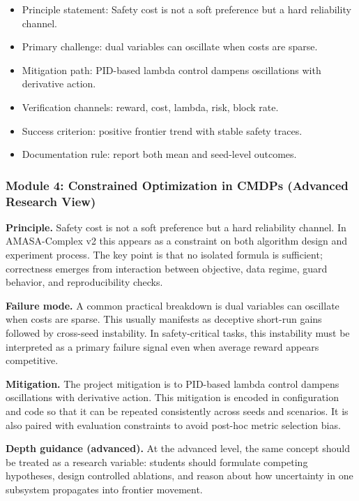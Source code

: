 \documentclass[conference]{IEEEtran}
\begin{document}
\begin{itemize}[leftmargin=*]
  \item Principle statement: Safety cost is not a soft preference but a hard reliability channel.
  \item Primary challenge: dual variables can oscillate when costs are sparse.
  \item Mitigation path: PID-based lambda control dampens oscillations with derivative action.
  \item Verification channels: reward, cost, lambda, risk, block rate.
  \item Success criterion: positive frontier trend with stable safety traces.
  \item Documentation rule: report both mean and seed-level outcomes.
\end{itemize}


\subsubsection{Module 4: Constrained Optimization in CMDPs (Advanced Research View)}
\textbf{Principle.} Safety cost is not a soft preference but a hard reliability channel. In AMASA-Complex v2 this appears as a constraint on both algorithm design and experiment process. The key point is that no isolated formula is sufficient; correctness emerges from interaction between objective, data regime, guard behavior, and reproducibility checks.

\textbf{Failure mode.} A common practical breakdown is dual variables can oscillate when costs are sparse. This usually manifests as deceptive short-run gains followed by cross-seed instability. In safety-critical tasks, this instability must be interpreted as a primary failure signal even when average reward appears competitive.

\textbf{Mitigation.} The project mitigation is to PID-based lambda control dampens oscillations with derivative action. This mitigation is encoded in configuration and code so that it can be repeated consistently across seeds and scenarios. It is also paired with evaluation constraints to avoid post-hoc metric selection bias.

\textbf{Depth guidance (advanced).} At the advanced level, the same concept should be treated as a research variable: students should formulate competing hypotheses, design controlled ablations, and reason about how uncertainty in one subsystem propagates into frontier movement.
\end{document}
